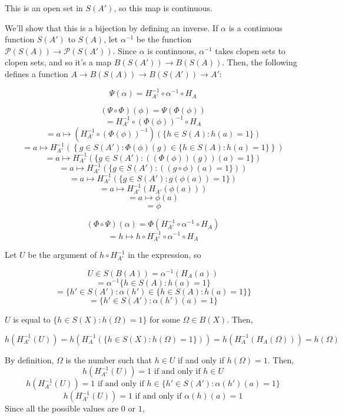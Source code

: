 \documentclass{article}
\begin{document}
      This is an open set in $S(A')$, so this map is continuous.

      We'll show that this is a bijection by defining an inverse. If $\alpha$ is
      a continuous function $S(A')$ to $S(A)$, let $\alpha^{-1}$  be the
      function $\mathcal{P}(S(A)) \to \mathcal{P}(S(A'))$. Since $\alpha$ is
      continuous, $\alpha^{-1}$ takes clopen sets to clopen sets, and so it's a map
      $B(S(A')) \to B(S(A))$. Then, the following defines a function $A \to
      B(S(A)) \to B(S(A')) \to A'$:

      \[\Psi(\alpha) = H_{A'}^{-1} \circ \alpha^{-1} \circ H_A\]

      \[(\Psi \circ \Phi)(\phi) = \Psi(\Phi(\phi))\]
      \[ = H_{A'}^{-1} \circ (\Phi(\phi))^{-1} \circ H_A \]
      \[ = a \mapsto (H_{A'}^{-1} \circ (\Phi(\phi))^{-1})  \left(\{h \in S(A) : h(a) =
      1 \}\right) \]
      \[ = a \mapsto H_{A'}^{-1} \left( \left\{g \in S(A') : \Phi(\phi)(g) \in \{h \in S(A) : h(a) =
      1 \}\right\} \right) \]
      \[ = a \mapsto H_{A'}^{-1} (\{g \in S(A') : ((\Phi(\phi))(g))(a) = 1 \}) \]
      \[ = a \mapsto H_{A'}^{-1} (\{g \in S(A') : ((g \circ \phi)(a) = 1 \})) \]
      \[ = a \mapsto H_{A'}^{-1} (\{g \in S(A') : g(\phi(a)) = 1 \}) \]
      \[ = a \mapsto H_{A'}^{-1} (H_{A'}(\phi(a))) \]
      \[ = a \mapsto \phi(a)\]
      \[ = \phi\]

      \[(\Phi \circ \Psi)(\alpha) = \Phi(H_{A'}^{-1} \circ \alpha^{-1} \circ
      H_A)\]
      \[= h \mapsto h \circ H_{A'}^{-1} \circ \alpha^{-1} \circ H_A \]

      Let $U$ be the argument of $h \circ H_{A'}^{-1}$ in the expression, so

      \[U \in S(B(A)) = \alpha^{-1} (H_A (a))\]
      \[ = \alpha^{-1} \{h \in S(A) : h(a) = 1 \}\]
      \[ = \{h' \in S(A') :\alpha(h') \in \{ h \in S(A) : h(a) = 1\} \}\]
      \[ = \{h' \in S(A') : \alpha(h')(a) = 1\} \]


      $U$ is equal to $\{h \in S(X) : h(\Omega) = 1\}$ for some $\Omega \in
      B(X)$. Then,

      \[ h ( H_{A'}^{-1} (U)) =  h(H_A^{-1}(\{h \in S(X) : h(\Omega) = 1\})) = h(H_A^{-1}(H_A(\Omega))) =
      h(\Omega)\]

      By definition, $\Omega$ is the number such that $h \in U$ if and only if
      $h(\Omega) = 1$. Then,
      \[ h ( H_{A'}^{-1} (U)) = 1 \text{ if and only if } h \in U\]
      \[ h ( H_{A'}^{-1} (U)) = 1 \text{ if and only if } h \in \{h' \in S(A') :
      \alpha(h')(a) = 1\} \]
      \[ h ( H_{A'}^{-1} (U)) = 1 \text{ if and only if } \alpha(h)(a) = 1\]
      Since all the possible values are $0$ or $1$,
\end{document}
